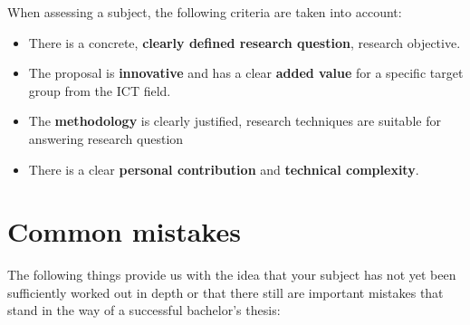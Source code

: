When assessing a subject, the following criteria are taken into account:

\begin{itemize}
 \item There is a concrete, \textbf{clearly defined research question}, research objective.
 \item The proposal is \textbf{innovative} and has a clear \textbf{added value} for a specific target group from the ICT field.
 \item The \textbf{methodology} is clearly justified, research techniques are suitable for answering research question
 \item There is a clear \textbf{personal contribution} and \textbf{technical complexity}.
\end{itemize}

\section{Common mistakes}
\label{sec:subjectcommonmistakes}

The following things provide us with the idea that your subject has not yet been sufficiently worked out in depth or that there still are important mistakes that stand in the way of a successful bachelor's thesis:

